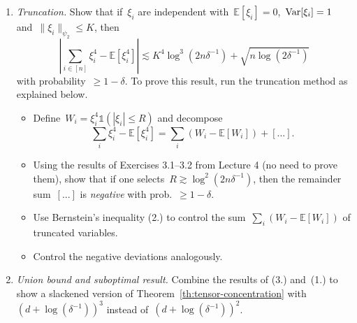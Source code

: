 \documentclass[11pt]{article}
\newcommand{\E}{\mathds{E}}
\newcommand{\Var}{\textup{Var}}
\newcommand{\Sphere}{\mathds{S}}
\newcommand{\lsim}{\lesssim}
\newcommand{\rsim}{\gtrsim}
\newcommand{\leqs}{\leqslant}
\newcommand{\geqs}{\geqslant}
\renewcommand{\le}{\leqs}
\renewcommand{\ge}{\geqs}
\begin{document}
\begin{enumerate}
\item {\em Truncation.} 
Show that if~$\xi_i$ are independent with~$\E[\xi_i] = 0$,~$\Var[\xi_i] = 1$ and~$\|\xi_i\|_{\psi_2} \le K$, then
\begin{equation}
\label{eq:quartic-sum-deviations}
\left| \textstyle\sum_{i \in [n]} \xi_i^4 - \E[\xi_i^4] \right| 
\lsim 
K^4 \log^3(2n\delta^{-1}) + \sqrt{n\log(2\delta^{-1})}
\end{equation}
with probability~$\ge 1-\delta$.
To prove this result, run the truncation method as explained below.
\begin{itemize}
\item Define~$W_i = \xi_i^4 \mathds{1}(|\xi_i| \le R)$ and decompose
\[
\sum_{i} \xi_i^4 - \E[\xi_i^4] = \sum_i (W_i - \E[W_i]) + [...].
\]
\item
Using the results of Exercises 3.1--3.2 from Lecture 4 (no need to prove them), show that if one selects~$R \rsim \log^2(2n\delta^{-1})$, then the remainder sum~$[...]$ is {\em negative} with prob.~$\ge 1-\delta$. 
\item 
Use Bernstein's inequality (2.) to control the sum~$\sum_i (W_i - \E[W_i])$ of truncated variables. 
\item
Control the negative deviations analogously.
\end{itemize}
\item {\em Union bound and suboptimal result.} 
Combine the results of (3.) and~(1.) to show a slackened version of Theorem~\ref{th:tensor-concentration} with~$(d+ \log(\delta^{-1}))^3$ instead of~$(d+ \log(\delta^{-1}))^2$.

\end{enumerate}
\end{document}

